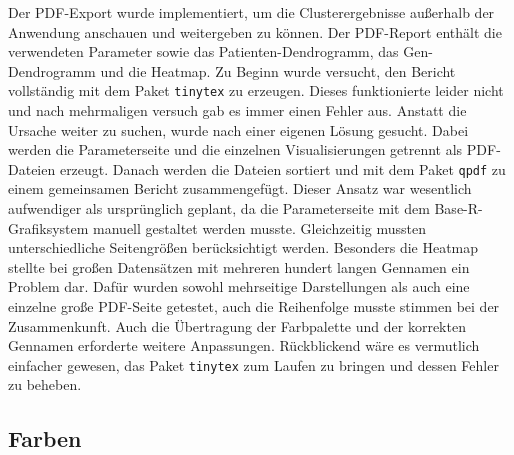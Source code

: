 \documentclass[12pt]{article}
\begin{document}
Der PDF-Export wurde implementiert, um die Clusterergebnisse außerhalb der Anwendung anschauen und weitergeben zu können. Der PDF-Report enthält die verwendeten Parameter sowie das Patienten-Dendrogramm, das Gen-Dendrogramm und die Heatmap. Zu Beginn wurde versucht, den Bericht vollständig mit dem Paket \texttt{tinytex} zu erzeugen. Dieses funktionierte leider nicht und nach mehrmaligen versuch gab es immer einen Fehler aus. Anstatt die Ursache weiter zu suchen, wurde nach einer eigenen Lösung gesucht. Dabei werden die Parameterseite und die einzelnen Visualisierungen getrennt als PDF-Dateien erzeugt. Danach werden die Dateien sortiert und mit dem Paket \texttt{qpdf} zu einem gemeinsamen Bericht zusammengefügt. Dieser Ansatz war wesentlich aufwendiger als ursprünglich geplant, da die Parameterseite mit dem Base-R-Grafiksystem manuell gestaltet werden musste. Gleichzeitig mussten unterschiedliche Seitengrößen berücksichtigt werden. Besonders die Heatmap stellte bei großen Datensätzen mit mehreren hundert langen Gennamen ein Problem dar. Dafür wurden sowohl mehrseitige Darstellungen als auch eine einzelne große PDF-Seite getestet, auch die Reihenfolge musste stimmen bei der  Zusammenkunft. Auch die Übertragung der Farbpalette und der korrekten Gennamen erforderte weitere Anpassungen. Rückblickend wäre es vermutlich einfacher gewesen, das Paket \texttt{tinytex} zum Laufen zu bringen und dessen Fehler zu beheben.
\newpage
\pagestyle{fancy}
\fancyhead{}
\subsection{Farben}
\end{document}
